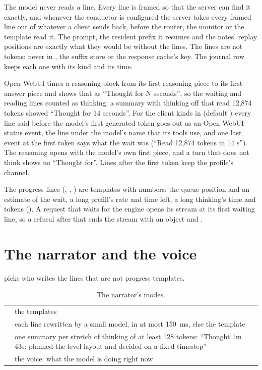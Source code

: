 The model never reads a line. Every line is framed so that the server can find it exactly, and whenever the conductor is configured the server takes every framed line out of whatever a client sends back, before the router, the monitor or the template read it. The prompt, the resident prefix it resumes and the notes' replay positions are exactly what they would be without the lines. The lines are not tokens: never in , the suffix store or the response cache's key. The journal row keeps each one with its kind and its time.

Open WebUI times a reasoning block from its first reasoning piece to its first answer piece and shows that as \enquote{Thought for N seconds}, so the waiting and reading lines counted as thinking: a summary with thinking off that read 12,874 tokens showed \enquote{Thought for 14 seconds}. For the client kinds in  (default ) every line said before the model's first generated token goes out as an Open WebUI status event, the line under the model's name that its tools use, and one last event at the first token says what the wait was (\enquote{Read 12,874 tokens in 14 s}). The reasoning opens with the model's own first piece, and a turn that does not think shows no \enquote{Thought for}. Lines after the first token keep the profile's channel.

The progress lines (, , ) are templates with numbers: the queue position and an estimate of the wait, a long prefill's rate and time left, a long thinking's time and tokens (). A request that waits for the engine opens its stream at its first waiting line, so a refusal after that ends the stream with an  object and \code{[DONE]}.

\section{The narrator and the voice}

 picks who writes the lines that are not progress templates.

\begin{table}[htbp]
\centering\small
\caption{The narrator's modes.}\label{tab:narrator-modes}
\begin{tabularx}{\linewidth}{@{}L{.12\linewidth}Y@{}}
\toprule
{} &  \\
\midrule
{} & the templates \\
 & each line rewritten by a small model, in at most 150~ms, else the template \\
 & one summary per stretch of thinking of at least 128 tokens: \enquote{Thought 1m 43s: planned the level layout and decided on a fixed timestep} \\
 & the voice: what the model is doing right now \\
\bottomrule
\end{tabularx}
\end{table}

